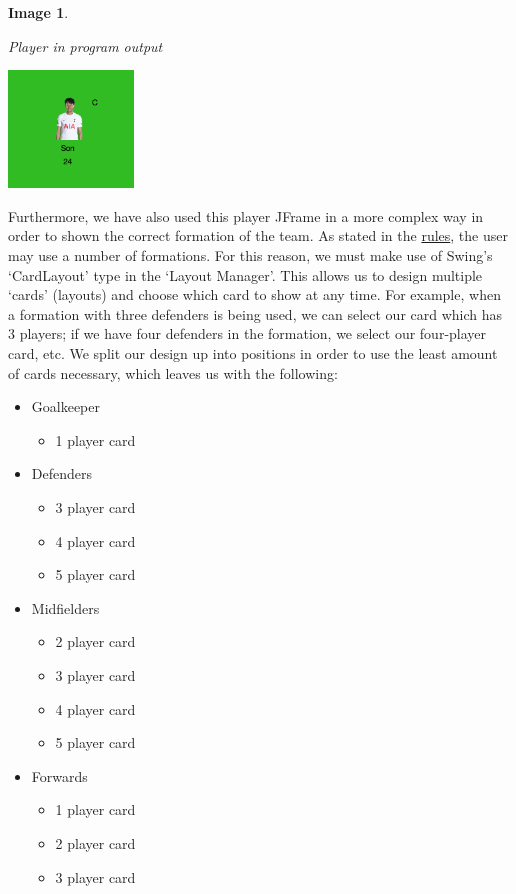 \documentclass[12pt, a4paper, oneside]{book}
\newtheorem{image}[theorem]{Image}
\numberwithin{equation}{section}
\begin{document}
\begin{image} \label{Player in program output}

  Player in program output

  \vspace{0.5cm}

  \centerline{\includegraphics[width=0.25\textwidth]{images/gui/fantasy-tab/player.png}}

\end{image}

Furthermore, we have also used this player JFrame in a more complex way in order to shown the correct formation of the team. As stated in the \hyperref[managing your squad rules]{rules}, the user may use a number of formations. For this reason, we must make use of Swing's `CardLayout' type in the `Layout Manager'. This allows us to design multiple `cards' (layouts) and choose which card to show at any time. For example, when a formation with three defenders is being used, we can select our card which has 3 players; if we have four defenders in the formation, we select our four-player card, etc. We split our design up into positions in order to use the least amount of cards necessary, which leaves us with the following:

\begin{itemize}
  \item Goalkeeper
  \begin{itemize}
    \item 1 player card
  \end{itemize}
  \item Defenders
  \begin{itemize}
    \item 3 player card
    \item 4 player card
    \item 5 player card
  \end{itemize}
  \item Midfielders
  \begin{itemize}
    \item 2 player card
    \item 3 player card
    \item 4 player card
    \item 5 player card
  \end{itemize}
  \item Forwards
  \begin{itemize}
    \item 1 player card
    \item 2 player card
    \item 3 player card
  \end{itemize}
\end{itemize}
\end{document}
